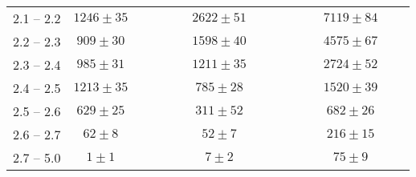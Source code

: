 {{\begin{tabular}{|c|c|c|c|c|c|c|c|c|c|c|c|c|c|c|}
            \cline{1-2}\cline{7-7}\cline{13-13}
            2.1 -- 2.2               & $1246\pm35$&                                      &                                        &                                   &                                  &$2622\pm51$&                 &                  &                   &                  &                    & $7119\pm84$ &                   & \\   
            \cline{1-2}\cline{7-7}\cline{13-13}
            2.2 -- 2.3               & $909\pm30$ &                                      &                                        &                                   &                                  &$1598\pm40$&                &                  &                   &                  &                    & $4575\pm67$&                  & \\   
            \cline{1-2}\cline{7-7}\cline{13-13}
            2.3 -- 2.4               & $985\pm31$&                                      &                                        &                                   &                                  &$1211\pm35$&                &                  &                   &                  &                    & $2724\pm52$ &                   & \\   
            \cline{1-2}\cline{7-7}\cline{13-13}
            2.4 -- 2.5               & $1213\pm35$&                                     &                                        &                                   &                                  &$785\pm28$&                &                  &                   &                  &                    & $1520\pm39$ &                  & \\   
            \cline{1-2}\cline{7-7}\cline{13-13}
            2.5 -- 2.6               & $629\pm25$&                                     &                                        &                                   &                                  &$311\pm52$&                 &                  &                   &                  &                    & $682\pm26$  &                  & \\   
            \cline{1-2}\cline{7-7}\cline{13-13}
            2.6 -- 2.7               & $62\pm8$&                                     &                                        &                                   &                                  &$52\pm7$&                &                  &                   &                  &                    & $216\pm15$ &                   & \\   
            \cline{1-2}\cline{7-7}\cline{13-13}
            2.7 -- 5.0               & $1\pm1$&                                     &                                        &                                   &                                  &$7\pm2$ &                &                  &                   &                  &                    & $75\pm9$ &                  & \\   
            \hline
        \end{tabular}
    }
}
